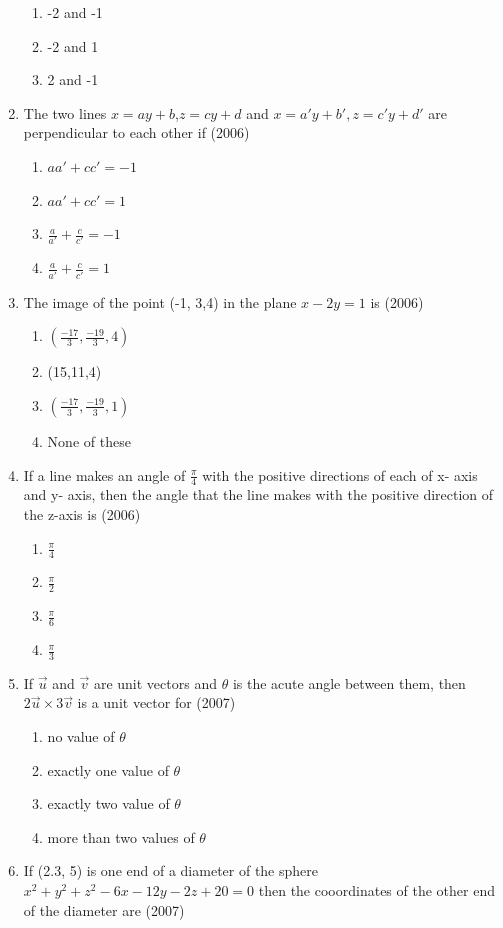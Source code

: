 \documentclass[12pt]{article}
\providecommand{\brak}[1]{\ensuremath{\left(#1\right)}}
\begin{document}
\begin{enumerate}
\begin{enumerate}
\item -2 and -1
\item -2 and 1
\item 2 and -1
\end{enumerate}
\item  The two lines $x=ay+b$,$z=cy+d$ and $x=a'y+b',z=c'y+d'$ are perpendicular to each other if (2006)
\begin{enumerate}
\item $aa'+cc'=-1$
\item $aa'+cc'=1$
\item $\frac{a}{a'}+\frac{c}{c'}=-1$
\item $\frac{a}{a'}+\frac{c}{c'}=1$
\end{enumerate}
\item  The image of the point (-1, 3,4) in the plane $x-2y=1$ is (2006)
\begin{enumerate}
\item $\brak{\frac{-17}{3},\frac{-19}{3},4}$
\item (15,11,4)
\item $\brak{\frac{-17}{3},\frac{-19}{3},1}$
\item None of these
\end{enumerate}
\item If a line makes an angle of $\frac{\pi}{4}$ with the positive directions of each of x- axis and y- axis, then the angle that the line makes with the positive direction of the z-axis is (2006)
\begin{enumerate}
\item $\frac{\pi}{4}$
\item $\frac{\pi}{2}$
\item $\frac{\pi}{6}$
\item $\frac{\pi}{3}$
\end{enumerate}
\item If $\vec{u}$ and $\vec{v}$ are unit vectors and $\theta$ is the acute angle between them, then $2\vec{u}\times 3\vec{v}$ is a unit vector for (2007)
\begin{enumerate}
\item no value of $\theta$
\item exactly one value of $\theta$
\item exactly two value of $\theta$
\item more than two values of $\theta$
\end{enumerate}
\item If (2.3, 5) is one end of a diameter of the sphere $x^2+y^2+z^2-6x-12y-2z+20=0$ then the cooordinates of the other end of the diameter are  (2007)

\end{enumerate}
\end{document}
